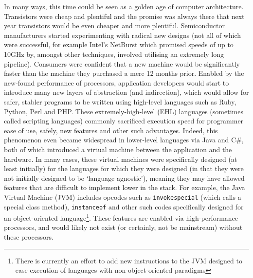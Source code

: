 In many ways, this time could be seen as a golden age of computer architecture. Transistors were cheap and plentiful and the promise was always there that next year transistors would be even cheaper and more plentiful. Semiconductor manufacturers started experimenting with radical new designs (not all of which were successful, for example Intel's NetBurst which promised speeds of up to 10GHz by, amongst other techniques, involved utilising an extremely long pipeline). Consumers were confident that a new machine would be significantly faster than the machine they purchased a mere 12 months prior. Enabled by the new-found performance of processors, application developers would start to introduce many new layers of abstraction (and indirection), which would allow for safer, stabler programs to be written using high-level languages such as Ruby, Python, Perl and PHP. These extremely-high-level (EHL) languages (sometimes called scripting languages) commonly sacrificed execution speed for programmer ease of use, safely, new features and other such advantages. Indeed, this phenomenon even became widespread in lower-level languages via Java and C\#, both of which introduced a virtual machine between the application and the hardware. In many cases, these virtual machines were specifically designed (at least initially) for the languages for which they were designed (in that they were not initially designed to be `language agnostic'), meaning they may have allowed features that are difficult to implement lower in the stack. For example, the Java Virtual Machine (JVM) includes opcodes such as \texttt{invokespecial} (which calls a special class method), \texttt{instanceof} and other such codes specifically designed for an object-oriented language\footnote{There is currently an effort to add new instructions to the JVM designed to ease execution of languages with non-object-oriented paradigms}. These features are enabled via high-performance processors, and would likely not exist (or certainly, not be mainstream) without these processors.

